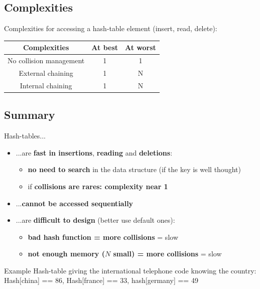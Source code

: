 \documentclass{beamer}[10pt, usepdftitle=false, handout]
\begin{document}
	\subsection{Complexities}
	
	\begin{frame}
	
	Complexities for accessing a hash-table element (insert, read, delete):
	
	\vspace*{1em}	
	
	\begin{center}
		
	\begin{tabular}{|c|c|c|}
	\hline
	\textbf{Complexities} & \textbf{At best} & \textbf{At worst} \\ \hline 
	No collision management & 1 & 1 \\ \hline
	External chaining & 1 & N \\ \hline
	Internal chaining & 1 & N \\ \hline
	\end{tabular}
	\end{center}		
	
	\end{frame}

	\subsection{Summary}
	
	\begin{frame}
	
	Hash-tables...	
	
	\begin{itemize}
		\item {...are \textbf{fast in insertions}, \textbf{reading} and \textbf{deletions}:
			\begin{itemize}
				\item {\textbf{no need to search} in the data structure (if the key is well thought)}
				\item {if \textbf{collisions are rares: complexity near 1}}
				
			\end{itemize}
		}	
		\item {...\textbf{cannot be accessed sequentially}} 
		\item {...are \textbf{difficult to design} (better use default ones):
			\begin{itemize}
				\item {\textbf{bad hash function = more collisions} = slow}
				\item {\textbf{not enough memory ($N$ small) = more collisions} = slow}
			\end{itemize}
		}
	\end{itemize}		
	
	\vspace*{1em}
	
	\begin{block}{Example}
	Hash-table giving the international telephone code knowing the country:
	Hash[china] == 86,
	Hash[france] == 33, hash[germany] == 49
	\end{block}		
			
	\end{frame}	
	
\end{document}

